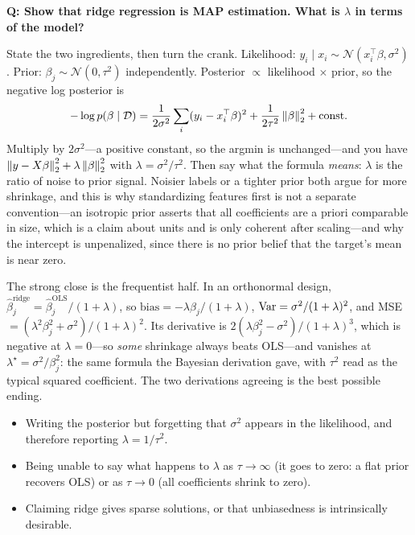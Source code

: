 \begin{interviewq}
\textbf{Q: Show that ridge regression is MAP estimation. What is $\lambda$ in terms of the model?}

 \quad {} \quad \badgefreq{\freqmed}

\stronganswer

State the two ingredients, then turn the crank. Likelihood: $y_i \mid x_i \sim \mathcal{N}(x_i^\top\beta, \sigma^2)$. Prior: $\beta_j \sim \mathcal{N}(0,\tau^2)$ independently. Posterior $\propto$ likelihood $\times$ prior, so the negative log posterior is
\begin{equation*}
-\log p(\beta\mid\mathcal{D}) = \frac{1}{2\sigma^2}\sum_i (y_i - x_i^\top\beta)^2 + \frac{1}{2\tau^2}\left\lVert\beta\right\rVert_2^2 + \text{const}.
\end{equation*}
Multiply by $2\sigma^2$---a positive constant, so the argmin is unchanged---and you have $\left\lVert y - X\beta\right\rVert_2^2 + \lambda\left\lVert\beta\right\rVert_2^2$ with $\lambda = \sigma^2/\tau^2$. Then say what the formula \textit{means}: $\lambda$ is the ratio of noise to prior signal. Noisier labels or a tighter prior both argue for more shrinkage, and this is why standardizing features first is not a separate convention---an isotropic prior asserts that all coefficients are a priori comparable in size, which is a claim about units and is only coherent after scaling---and why the intercept is unpenalized, since there is no prior belief that the target's mean is near zero.

The strong close is the frequentist half. In an orthonormal design, $\hat\beta^{\text{ridge}}_j = \hat\beta^{\text{OLS}}_j/(1+\lambda)$, so $\text{bias} = -\lambda\beta_j/(1+\lambda)$, $\operatorname{Var} = \sigma^2/(1+\lambda)^2$, and MSE $= (\lambda^2\beta_j^2 + \sigma^2)/(1+\lambda)^2$. Its derivative is $2(\lambda\beta_j^2 - \sigma^2)/(1+\lambda)^3$, which is negative at $\lambda=0$---so \textit{some} shrinkage always beats OLS---and vanishes at $\lambda^\star = \sigma^2/\beta_j^2$: the same formula the Bayesian derivation gave, with $\tau^2$ read as the typical squared coefficient. The two derivations agreeing is the best possible ending.

\redflags
\begin{itemize}
    \item Writing the posterior but forgetting that $\sigma^2$ appears in the likelihood, and therefore reporting $\lambda = 1/\tau^2$.
    \item Being unable to say what happens to $\lambda$ as $\tau \to \infty$ (it goes to zero: a flat prior recovers OLS) or as $\tau \to 0$ (all coefficients shrink to zero).
    \item Claiming ridge gives sparse solutions, or that unbiasedness is intrinsically desirable.
\end{itemize}


\end{interviewq}
